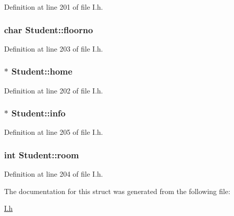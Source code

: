 \-Definition at line 201 of file \-I.\-h.

\hypertarget{structStudent_a48518eca5f8dc260e219e97116a9afa4}{
\subsubsection[{floorno}]{\setlength{\rightskip}{0pt plus 5cm}char {\bf \-Student\-::floorno}}}\label{structStudent_a48518eca5f8dc260e219e97116a9afa4}


\-Definition at line 203 of file \-I.\-h.

\hypertarget{structStudent_a5120bee9c5391fa9b102211d466f6541}{
\subsubsection[{home}]{$\ast$ {\bf \-Student\-::home}}}\label{structStudent_a5120bee9c5391fa9b102211d466f6541}


\-Definition at line 202 of file \-I.\-h.

\hypertarget{structStudent_a50be18920d1298fedf179c0caa49f0d6}{
\subsubsection[{info}]{$\ast$ {\bf \-Student\-::info}}}\label{structStudent_a50be18920d1298fedf179c0caa49f0d6}


\-Definition at line 205 of file \-I.\-h.

\hypertarget{structStudent_abd1d6b3e6952e3fdabe131b635308344}{
\subsubsection[{room}]{\setlength{\rightskip}{0pt plus 5cm}int {\bf \-Student\-::room}}}\label{structStudent_abd1d6b3e6952e3fdabe131b635308344}


\-Definition at line 204 of file \-I.\-h.



\-The documentation for this struct was generated from the following file\-:\begin{DoxyCompactItemize}
\item 
\hyperlink{I_8h}{\-I.\-h}\end{DoxyCompactItemize}
